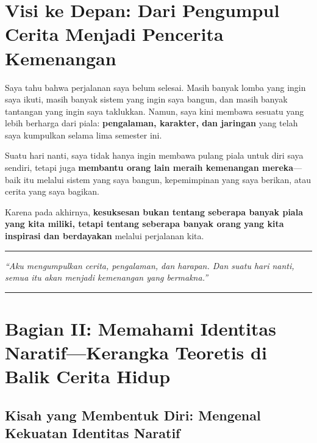 \documentclass[
  letterpaper,
  DIV=11,
  numbers=noendperiod]{scrreprt}
\begin{document}
\section{\texorpdfstring{\textbf{Visi ke Depan: Dari Pengumpul Cerita
Menjadi Pencerita
Kemenangan}}{Visi ke Depan: Dari Pengumpul Cerita Menjadi Pencerita Kemenangan}}\label{visi-ke-depan-dari-pengumpul-cerita-menjadi-pencerita-kemenangan}

Saya tahu bahwa perjalanan saya belum selesai. Masih banyak lomba yang
ingin saya ikuti, masih banyak sistem yang ingin saya bangun, dan masih
banyak tantangan yang ingin saya taklukkan. Namun, saya kini membawa
sesuatu yang lebih berharga dari piala: \textbf{pengalaman, karakter,
dan jaringan} yang telah saya kumpulkan selama lima semester ini.

Suatu hari nanti, saya tidak hanya ingin membawa pulang piala untuk diri
saya sendiri, tetapi juga \textbf{membantu orang lain meraih kemenangan
mereka}---baik itu melalui sistem yang saya bangun, kepemimpinan yang
saya berikan, atau cerita yang saya bagikan.

Karena pada akhirnya, \textbf{kesuksesan bukan tentang seberapa banyak
piala yang kita miliki, tetapi tentang seberapa banyak orang yang kita
inspirasi dan berdayakan} melalui perjalanan kita.

\begin{center}\rule{0.5\linewidth}{0.5pt}\end{center}

\emph{``Aku mengumpulkan cerita, pengalaman, dan harapan. Dan suatu hari
nanti, semua itu akan menjadi kemenangan yang bermakna.''}

\begin{center}\rule{0.5\linewidth}{0.5pt}\end{center}

\section{\texorpdfstring{\textbf{Bagian II: Memahami Identitas
Naratif---Kerangka Teoretis di Balik Cerita
Hidup}}{Bagian II: Memahami Identitas Naratif---Kerangka Teoretis di Balik Cerita Hidup}}\label{bagian-ii-memahami-identitas-naratifkerangka-teoretis-di-balik-cerita-hidup}

\subsection{\texorpdfstring{\textbf{Kisah yang Membentuk Diri: Mengenal
Kekuatan Identitas
Naratif}}{Kisah yang Membentuk Diri: Mengenal Kekuatan Identitas Naratif}}\label{kisah-yang-membentuk-diri-mengenal-kekuatan-identitas-naratif}
\end{document}
